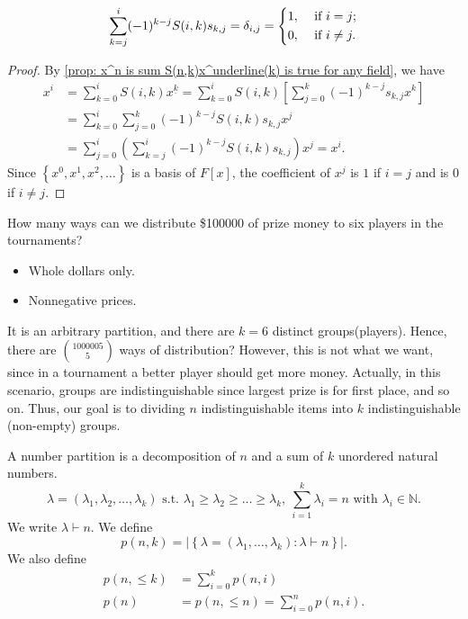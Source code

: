\begin{corollary}
    \[
        \sum_{k=j}^i (-1)^{k-j} S(i, k) s_{k,j} = \delta _{i,j} = \begin{dcases}
            1, &\text{ if } i=j ;\\
            0, &\text{ if }  i \neq j.
        \end{dcases} 
    \]
\end{corollary}
\begin{proof}
    By \autoref{prop: x^n is sum S(n,k)x^underline(k) is true for any field}, we have 
    \begin{align*}
        x^i &= \sum_{k=0}^i S(i, k)x^{\underline{k}} = \sum_{k=0}^i S(i, k) \left[ \sum_{j=0}^k (-1)^{k-j} s_{k, j}x^k  \right] \\
        &= \sum_{k=0}^i \sum_{j=0}^k (-1)^{k-j} S(i, k) s_{k, j}x^j \\
        &= \sum_{j=0}^i \left( \sum_{k=j}^i (-1)^{k-j} S(i, k) s_{k, j} \right) x^j = x^i.    
    \end{align*}
    Since \(\left\{ x^0, x^1, x^2, \dots  \right\} \) is a basis of \(F[x]\), the coefficient of \(x^j\) is \(1\) if \(i=j\) and is \(0\) if \(i \neq j\).      
\end{proof}

\begin{question}
    How many ways can we distribute \$100000 of prize money to six players in the tournaments?
    \begin{itemize}
        \item Whole dollars only. 
        \item Nonnegative prices.
    \end{itemize}
\end{question}
It is an arbitrary partition, and there are \(k=6\) distinct groups(players). Hence, there are \(\binom{1000005}{5}\) ways of distribution? However, this is not what we want, since in a tournament a better player should get more money. Actually, in this scenario, groups are indistinguishable since largest prize is for first place, and so on. Thus, our goal is to dividing \(n\) indistinguishable items into \(k\) indistinguishable (non-empty) groups. 

\begin{definition}
    A number partition is a decomposition of \(n\) and a sum of \(k\) unordered natural numbers.  
    \[
        \lambda = (\lambda _1, \lambda _2, \dots , \lambda _k) \text{ s.t. } \lambda _1 \ge \lambda _2 \ge \dots \ge \lambda _k, \ \sum_{i=1}^k \lambda  _i = n \text{ with } \lambda _i \in \mathbb{N} . 
    \]
    We write \(\lambda \vdash n\). We define 
    \[
        p(n, k) = \left\vert \left\{ \lambda = (\lambda _1, \dots , \lambda _k) : \lambda \vdash n \right\}  \right\vert.
    \] 
    We also define 
    \begin{align*}
        p(n, \le k) &= \sum_{i=0}^k p(n, i) \\
        p(n) &= p(n, \le n) = \sum_{i=0}^n p(n, i) .
    \end{align*}
\end{definition}

